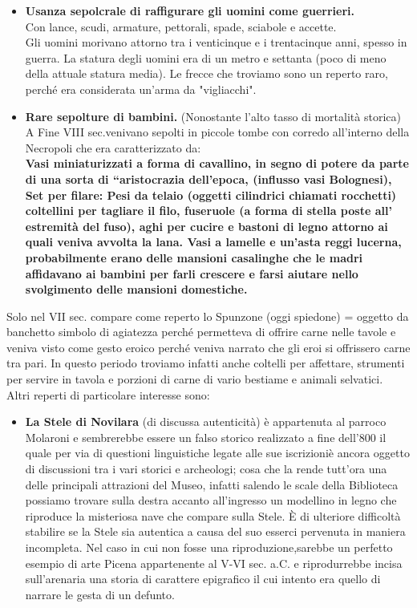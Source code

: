 \documentclass[hidelinks,12pt,a4paper]{article}
\begin{document}
\begin{flushleft}
\begin{itemize}
			\item \textbf{Usanza sepolcrale di raffigurare gli uomini come guerrieri.}\\
			Con lance, scudi, armature, pettorali, spade, sciabole e accette.\\
			Gli uomini morivano attorno tra i venticinque e i trentacinque anni, spesso in guerra.
			 La statura degli uomini era di un metro e settanta (poco di meno della attuale statura media).
			 Le frecce che troviamo sono un reperto raro, perché era considerata un'arma da "vigliacchi".
			
			\item \textbf{Rare sepolture di bambini.} (Nonostante l'alto tasso di mortalità storica)\\
			 A Fine VIII sec.venivano sepolti in piccole tombe con corredo all'interno della Necropoli che era caratterizzato da:
			\\ \textbf{Vasi miniaturizzati a forma di cavallino, in segno di potere da parte di una sorta di “aristocrazia dell’epoca, (influsso vasi Bolognesi), Set per filare: Pesi da telaio (oggetti cilindrici chiamati rocchetti) coltellini per tagliare il filo, fuseruole (a forma di stella poste all’ estremità del fuso), aghi per cucire e bastoni di legno attorno ai quali veniva avvolta la lana. Vasi a lamelle e un'asta reggi lucerna, probabilmente erano delle mansioni casalinghe che le madri affidavano ai bambini per farli crescere e farsi aiutare nello svolgimento delle mansioni domestiche.}\\
		\end{itemize}
		Solo nel VII sec. compare come reperto lo Spunzone (oggi spiedone) = oggetto da banchetto simbolo di agiatezza perché permetteva di offrire carne nelle tavole e veniva visto come gesto eroico perché veniva narrato che gli eroi si offrissero carne tra pari. In questo periodo troviamo infatti anche coltelli per affettare, strumenti per servire in tavola e porzioni di carne di vario bestiame e animali selvatici.\\
		Altri reperti di particolare interesse sono:
		\begin{itemize}
			\item \textbf{La Stele di Novilara} (di discussa autenticità) è appartenuta al parroco Molaroni e sembrerebbe essere un falso storico realizzato a fine dell’800 il quale per via di questioni linguistiche legate alle sue iscrizioniè ancora oggetto di discussioni tra i vari storici e archeologi; cosa che la rende tutt'ora una delle principali attrazioni del Museo, infatti salendo le scale della Biblioteca possiamo trovare sulla destra accanto all'ingresso un modellino in legno che riproduce la misteriosa nave che compare sulla Stele.
			È di ulteriore difficoltà stabilire se la Stele sia autentica a causa del suo esserci pervenuta in maniera incompleta.
			Nel caso in cui non fosse una riproduzione,sarebbe un perfetto esempio di arte Picena appartenente al V-VI sec. a.C. e riprodurrebbe incisa sull'arenaria una storia di carattere epigrafico il cui intento era quello di narrare le gesta di un defunto. 
			

\end{itemize}
\end{flushleft}
\end{document}
